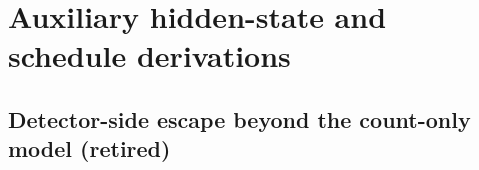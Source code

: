 %
%
\section{Auxiliary hidden-state and schedule derivations}
\label{supp:auxiliary}


\subsection{Detector-side escape beyond the count-only model (retired)}
